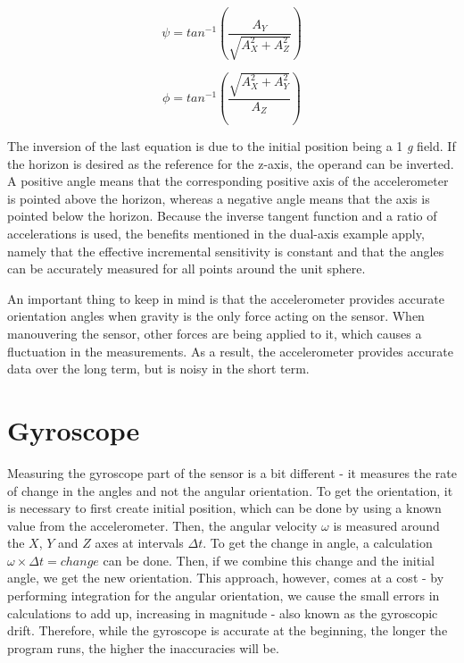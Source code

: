  \begin{equation}	
 	\psi=tan^{-1}\left(\frac{A_{Y}}{\sqrt{A_{X}^{2}+A_{Z}^{2}}}\right)
 \end{equation}
 
 \begin{equation}	
 	\phi=tan^{-1}\left(\frac{\sqrt{A_{X}^{2}+A_{Y}^{2}}}{A_{Z}}\right)
 \end{equation}
 
The inversion of the last equation is due to the initial position being a 1 \textit{g} field. If the horizon is desired as the reference for the z-axis, the operand can be inverted. A positive angle means that the corresponding positive axis of the accelerometer is pointed above the horizon, whereas a negative angle means that the axis is pointed below the horizon. Because the inverse tangent function and a ratio of accelerations is used, the benefits mentioned in the dual-axis example apply, namely that the effective incremental sensitivity is constant and that the angles can be accurately measured for all points around the unit sphere.

An important thing to keep in mind is that the accelerometer provides accurate orientation angles when gravity is the only force acting on the sensor. When manouvering the sensor, other forces are being applied to it, which causes a fluctuation in the measurements. As a result, the accelerometer provides accurate data over the long term, but is noisy in the short term\cite{AccelCite2}.

\section{Gyroscope}
Measuring the gyroscope part of the sensor is a bit different -  it measures the rate of change in the angles and not the angular orientation. To get the orientation, it is necessary to first create initial position, which can be done by using a known value from the accelerometer. Then, the angular velocity $\omega$ is measured around the $X$, $Y$ and $Z$ axes at intervals $\Delta t$. To get the change in angle, a calculation $\omega \times \Delta t = change$ can be done. Then, if we combine this change and the initial angle, we get the new orientation. This approach, however, comes at a cost - by performing integration for the angular orientation, we cause the small errors in calculations to add up, increasing in magnitude - also known as the gyroscopic drift. Therefore, while the gyroscope is accurate at the beginning, the longer the program runs, the higher the inaccuracies will be.

